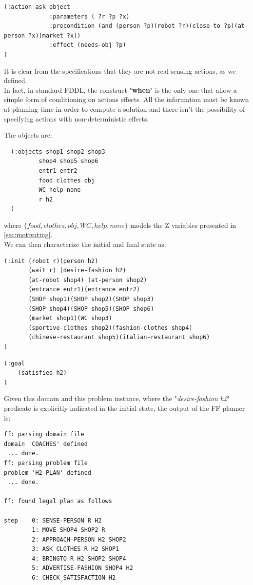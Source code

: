 \documentclass[pdftex,12pt,a4paper]{report}
\begin{document}
\begin{verbatim}
(:action ask_object 
             :parameters ( ?r ?p ?x)
             :precondition (and (person ?p)(robot ?r)(close-to ?p)(at-person ?x)(market ?x))
             :effect (needs-obj ?p)
)
\end{verbatim}

\noindent It is clear from the specifications that they are not real sensing actions, as we defined.\\ 
In fact, in standard PDDL, the construct "\textbf{when}" is the only one that allow a simple form of conditioning on actions effects. 
All the information must be known at planning time in order to compute a solution and there isn't the possibility of specifying actions with non-deterministic effects.

\noindent The objects are:
\begin{verbatim}
  (:objects shop1 shop2 shop3
          shop4 shop5 shop6
          entr1 entr2
          food clothes obj
          WC help none
          r h2
  )
\end{verbatim}
\noindent where $\{food, clothes, obj, WC, help, none\}$ models the Z variables presented in \ref{sec:motivating}.\\
\noindent We can then characterize the initial and final state as:
\begin{verbatim}
(:init (robot r)(person h2)
       (wait r) (desire-fashion h2)
	   (at-robot shop4) (at-person shop2)
       (entrance entr1)(entrance entr2)
       (SHOP shop1)(SHOP shop2)(SHOP shop3)
       (SHOP shop4)(SHOP shop5)(SHOP shop6)
       (market shop1)(WC shop3)
       (sportive-clothes shop2)(fashion-clothes shop4)
       (chinese-restaurant shop5)(italian-restaurant shop6)
)
\end{verbatim}

\begin{verbatim}
(:goal
    (satisfied h2)
)
\end{verbatim}
\noindent Given this domain and this problem instance, where the "\textit{desire-fashion h2}" predicate is explicitly indicated in the initial state, the output of the FF planner is:
\begin{verbatim}
ff: parsing domain file
domain 'COACHES' defined
 ... done.
ff: parsing problem file
problem 'H2-PLAN' defined
 ... done.    

ff: found legal plan as follows

step    0: SENSE-PERSON R H2
        1: MOVE SHOP4 SHOP2 R
        2: APPROACH-PERSON H2 SHOP2
        3: ASK_CLOTHES R H2 SHOP1
        4: BRINGTO R H2 SHOP2 SHOP4
        5: ADVERTISE-FASHION SHOP4 H2
        6: CHECK_SATISFACTION H2
\end{verbatim}
\end{document}
